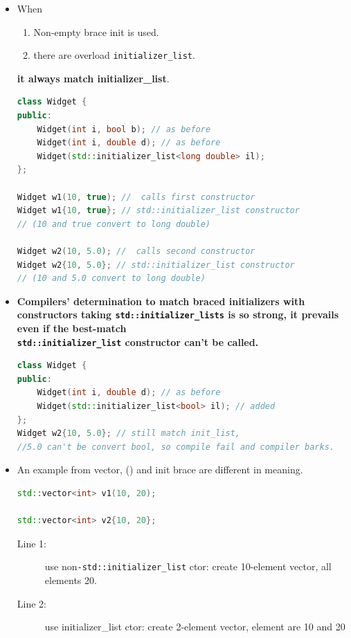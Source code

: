 \documentclass[a4paper,11pt,twoside]{book}
\begin{document}
\begin{itemize}

	\item When 
	\begin{enumerate}
		\item Non-empty brace init is used.
		\item there are overload \texttt{initializer\_list}.
	\end{enumerate}
	\textbf{it always match initializer\_list}.
\begin{lstlisting}[frame=single, language=c++,mathescape=true]
class Widget {
public:
	Widget(int i, bool b); // as before
	Widget(int i, double d); // as before
	Widget(std::initializer_list<long double> il);
};
	
Widget w1(10, true); //  calls first constructor
Widget w1{10, true}; // std::initializer_list constructor
// (10 and true convert to long double)

Widget w2(10, 5.0); //  calls second constructor
Widget w2{10, 5.0}; // std::initializer_list constructor
// (10 and 5.0 convert to long double)
\end{lstlisting}
	
	\item \textbf{ Compilers' determination to match braced initializers with constructors taking \texttt{std::initializer\_lists} is so strong, it prevails even if the best-match \\ \texttt{std::initializer\_list} constructor can't be called.}
\begin{lstlisting}[frame=single, language=c++,mathescape=true]
class Widget {
public:
	Widget(int i, double d); // as before
	Widget(std::initializer_list<bool> il); // added
};
Widget w2{10, 5.0}; // still match init_list,
//5.0 can't be convert bool, so compile fail and compiler barks.
\end{lstlisting}
	
	\item An example from vector, () and init brace are different in meaning.
\begin{lstlisting}[frame=single, language=c++,mathescape=true]
std::vector<int> v1(10, 20); 
	
std::vector<int> v2{10, 20}; 
\end{lstlisting}
\begin{description}
	\item[Line 1:] use non\texttt{-std::initializer\_list} ctor: create 10-element vector, all elements 20.
	\item[Line 2:] use initializer\_list ctor: create 2-element vector, element are 10 and 20
\end{description}
	

\end{itemize}
\end{document}
